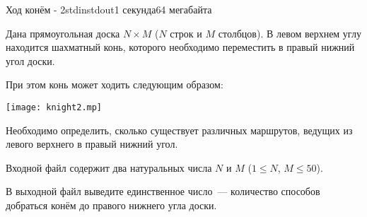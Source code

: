 \begin{problem}{Ход конём - 2}{stdin}{stdout}{1 секунда}{64 мегабайта}

Дана прямоугольная доска $N \times M$ ($N$ строк и $M$ столбцов). В левом верхнем углу находится шахматный конь, которого необходимо переместить в правый нижний угол доски.

При этом конь может ходить следующим образом:

\centerline{\texttt{[image: knight2.mp]}}

Необходимо определить, сколько существует различных маршрутов, ведущих из левого верхнего в правый нижний угол.

\InputFile
Входной файл содержит два натуральных числа $N$ и $M$ ($1 \le N$, $M \le 50$).


\OutputFile
В выходной файл выведите единственное число~--- количество способов добраться конём до правого нижнего угла доски.

\Examples

\begin{example}
%
%
\end{example}

\end{problem}

